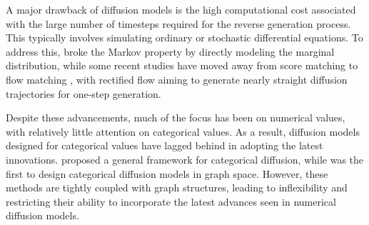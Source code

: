 A major drawback of diffusion models is the high computational cost associated with the large number of timesteps required for the reverse generation process. 
This typically involves simulating ordinary or stochastic differential equations. 
To address this, \cite{ICLR21Song} broke the Markov property by directly modeling the marginal distribution, while some recent studies have moved away from score matching to flow matching \cite{ICLR23Lipman}, with rectified flow \cite{ICLR23Liu} aiming to generate nearly straight diffusion trajectories for one-step generation.

Despite these advancements, much of the focus has been on numerical values, with relatively little attention on categorical values. 
As a result, diffusion models designed for categorical values have lagged behind in adopting the latest innovations.
\cite{NeurIPS21Austin} proposed a general framework for categorical diffusion, while \cite{ICLR24Shi} was the first to design categorical diffusion models in graph space. 
However, these methods are tightly coupled with graph structures, leading to inflexibility and restricting their ability to incorporate the latest advances seen in numerical diffusion models.


